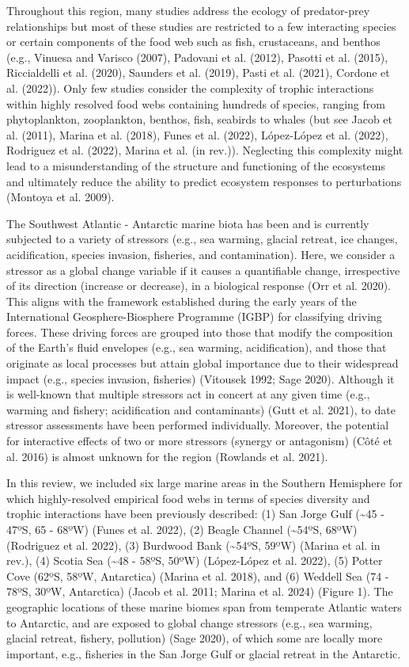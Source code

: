 \documentclass[
]{article}
\begin{document}
Throughout this region, many studies address the ecology of
predator-prey relationships but most of these studies are restricted to
a few interacting species or certain components of the food web such as
fish, crustaceans, and benthos (e.g., Vinuesa and Varisco (2007),
Padovani et al. (2012), Pasotti et al. (2015), Riccialdelli et al.
(2020), Saunders et al. (2019), Pasti et al. (2021), Cordone et al.
(2022)). Only few studies consider the complexity of trophic
interactions within highly resolved food webs containing hundreds of
species, ranging from phytoplankton, zooplankton, benthos, fish,
seabirds to whales (but see Jacob et al. (2011), Marina et al. (2018),
Funes et al. (2022), López-López et al. (2022), Rodriguez et al. (2022),
Marina et al. (in rev.)). Neglecting this complexity might lead to a
misunderstanding of the structure and functioning of the ecosystems and
ultimately reduce the ability to predict ecosystem responses to
perturbations (Montoya et al. 2009).

The Southwest Atlantic - Antarctic marine biota has been and is
currently subjected to a variety of stressors (e.g., sea warming,
glacial retreat, ice changes, acidification, species invasion,
fisheries, and contamination). Here, we consider a stressor as a global
change variable if it causes a quantifiable change, irrespective of its
direction (increase or decrease), in a biological response (Orr et al.
2020). This aligns with the framework established during the early years
of the International Geosphere-Biosphere Programme (IGBP) for
classifying driving forces. These driving forces are grouped into those
that modify the composition of the Earth's fluid envelopes (e.g., sea
warming, acidification), and those that originate as local processes but
attain global importance due to their widespread impact (e.g., species
invasion, fisheries) (Vitousek 1992; Sage 2020). Although it is
well-known that multiple stressors act in concert at any given time
(e.g., warming and fishery; acidification and contaminants) (Gutt et al.
2021), to date stressor assessments have been performed individually.
Moreover, the potential for interactive effects of two or more stressors
(synergy or antagonism) (Côté et al. 2016) is almost unknown for the
region (Rowlands et al. 2021).

In this review, we included six large marine areas in the Southern
Hemisphere for which highly-resolved empirical food webs in terms of
species diversity and trophic interactions have been previously
described: (1) San Jorge Gulf (\textasciitilde45 - 47ºS, 65 - 68ºW)
(Funes et al. 2022), (2) Beagle Channel (\textasciitilde54ºS, 68ºW)
(Rodriguez et al. 2022), (3) Burdwood Bank (\textasciitilde54ºS, 59ºW)
(Marina et al. in rev.), (4) Scotia Sea (\textasciitilde48 - 58ºS, 50ºW)
(López-López et al. 2022), (5) Potter Cove (62ºS, 58ºW, Antarctica)
(Marina et al. 2018), and (6) Weddell Sea (74 - 78ºS, 30ºW, Antarctica)
(Jacob et al. 2011; Marina et al. 2024) (Figure 1). The geographic
locations of these marine biomes span from temperate Atlantic waters to
Antarctic, and are exposed to global change stressors (e.g., sea
warming, glacial retreat, fishery, pollution) (Sage 2020), of which some
are locally more important, e.g., fisheries in the San Jorge Gulf or
glacial retreat in the Antarctic.
\end{document}
